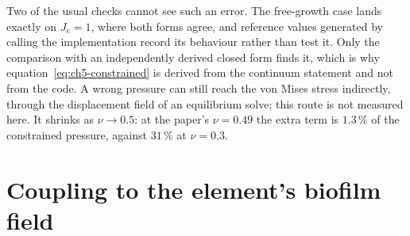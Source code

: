 Two of the usual checks cannot see such an error. The free-growth case lands
exactly on $J_e=1$, where both forms agree, and reference values generated by
calling the implementation record its behaviour rather than test it. Only the
comparison with an independently derived closed form finds it, which is why
equation~\eqref{eq:ch5-constrained} is derived from the continuum statement
and not from the code. A wrong pressure can still reach the von Mises stress
indirectly, through the displacement field of an equilibrium solve; this route
is not measured here. It shrinks as $\nu\to0.5$: at the paper's $\nu=0.49$
the extra term is $1.3\,\%$ of the constrained pressure, against $31\,\%$ at
$\nu=0.3$.

\section{Coupling to the element's biofilm field}
\label{sec:ch5-coupling}

